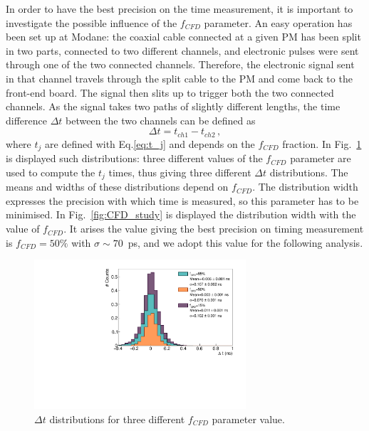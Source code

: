 In order to have the best precision on the time measurement, it is important to investigate the possible influence of the $f_{CFD}$ parameter.
An easy operation has been set up at Modane: the coaxial cable connected at a given PM has been split in two parts, connected to two different channels, and electronic pulses were sent through one of the two connected channels.
Therefore, the electronic signal sent in that channel travels through the split cable to the PM and come back to the front-end board.
The signal then slits up to trigger both the two connected channels.
As the signal takes two paths of slightly different lengths, the time difference $\Delta t$ between the two channels can be defined as
\begin{equation}
  \Delta t = t_{ch1}-t_{ch2}\,,
\end{equation}
where $t_{j}$ are defined with Eq.\eqref{eq:t_j} and depends on the $f_{CFD}$ fraction.
In Fig.~\ref{fig:deltat_CFD} is displayed such distributions: three different values of the $f_{CFD}$ parameter are used to compute the $t_{j}$ times, thus giving three different $\Delta t$ distributions.
The means and widths of these distributions depend on $f_{CFD}$.
The distribution width expresses the precision with which time is measured, so this parameter has to be minimised.
In Fig.~\ref{fig:CFD_study} is displayed the distribution width with the value of $f_{CFD}$.
It arises the value giving the best precision on timing measurement is $f_{CFD} = 50\%$ with $\sigma\sim70$~ps, and we adopt this value for the following analysis.
\begin{figure}[h!]
  \centering
  \includegraphics[width=0.7\textwidth]{commissioning/fig_commissioning/deltat.pdf}
  \caption{$\Delta t$ distributions for three different $f_{CFD}$ parameter value.
    \label{fig:deltat_CFD}}
\end{figure}
